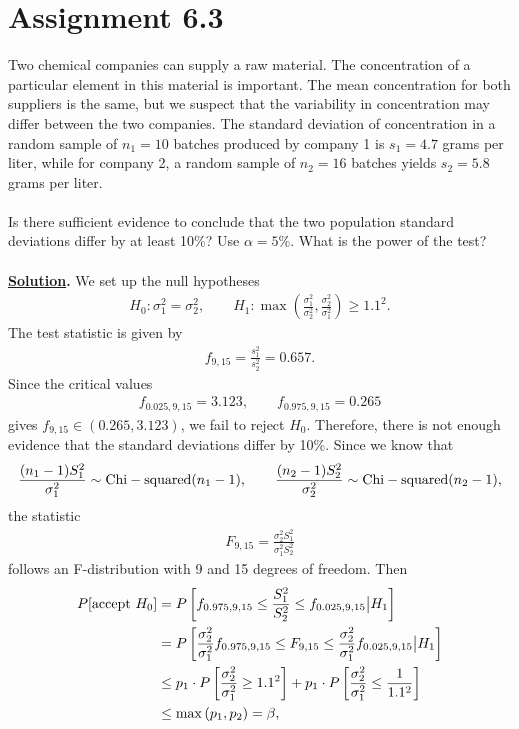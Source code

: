 \section*{Assignment 6.3}

Two chemical companies can supply a raw material. The concentration of a particular element in this material is important. The mean concentration for both suppliers is the same, but we suspect that the variability in concentration may differ between the two companies. The standard deviation of concentration in a random sample of $n_1 = 10$ batches produced by company 1 is $s_1 = 4.7$ grams per liter, while for company 2, a random sample of $n_2 = 16$ batches yields $s_2 = 5.8$ grams per liter. \\
~\\
Is there sufficient evidence to conclude that the two population standard deviations differ by at least 10\%? Use $\alpha = 5\%$. What is the power of the test? \\
~\\
\textbf{\underline{Solution}.} We set up the null hypotheses
\begin{align*}
H_0: \sigma_1^2 = \sigma_2^2, \qquad H_1: \max\left(\frac{\sigma_1^2}{\sigma_2^2}, \frac{\sigma_2^2}{\sigma_1^2} \right) \geq 1.1^2.
\end{align*}
The test statistic is given by
\begin{align*}
f_{9, 15} = \frac{s_1^2}{s_2^2} = 0.657.
\end{align*}
Since the critical values
\begin{align*}
f_{0.025, 9, 15} = 3.123, \qquad f_{0.975, 9, 15} = 0.265
\end{align*}
gives $f_{9, 15}\in (0.265, 3.123)$, we fail to reject $H_0$. Therefore, there is not enough evidence that the standard deviations differ by 10\%. Since we know that
\begin{align*}
\frac{(n_1-1)S_1^2}{\sigma_1^2} \sim \mathrm{Chi-squared}(n_1-1), \qquad \frac{(n_2-1)S_2^2}{\sigma_2^2} \sim \mathrm{Chi-squared}(n_2-1),
\end{align*}
the statistic
\begin{align*}
F_{9, 15} = \frac{\sigma_2^2S_1^2}{\sigma_1^2S_2^2}
\end{align*}
follows an F-distribution with 9 and 15 degrees of freedom. Then
\begin{align*}
P[\mathrm{accept\ } H_0] & = P\left[f_{0.975,9,15} \leq \frac{S_1^2}{S_2^2} \leq f_{0.025,9,15} \big| H_1 \right] \\
& = P\left[\frac{\sigma_2^2}{\sigma_1^2} f_{0.975,9,15} \leq F_{9,15} \leq \frac{\sigma_2^2}{\sigma_1^2} f_{0.025,9,15} \big| H_1 \right] \\
& \leq p_1\cdot P\left[\frac{\sigma_2^2}{\sigma_1^2} \geq 1.1^2 \right] + p_1\cdot P\left[\frac{\sigma_2^2}{\sigma_1^2} \leq \frac{1}{1.1^2} \right] \\
& \leq \max\left(p_1, p_2 \right) = \beta,
\end{align*}
